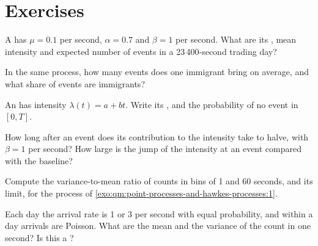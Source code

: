 \section{Exercises}

\begin{exercise}[$\star$]\label{exo:qm:point-processes-and-hawkes-processes:1}
A  has $\mu = 0.1$ per second, $\alpha = 0.7$ and $\beta = 1$ per second. What are its , mean
intensity and expected number of events in a 23\,400-second trading day?
\end{exercise}

\begin{exercise}[$\star$]\label{exo:qm:point-processes-and-hawkes-processes:2}
In the same process, how many events does one immigrant bring on average, and what share of events are
immigrants?
\end{exercise}

\begin{exercise}[$\star$]\label{exo:qm:point-processes-and-hawkes-processes:3}
An  has intensity $\lambda(t) = a + bt$. Write its , and the probability of
no event in $[0, T]$.
\end{exercise}

\begin{exercise}[$\star\star$]\label{exo:qm:point-processes-and-hawkes-processes:4}
How long after an event does its contribution to the intensity take to halve, with $\beta = 1$ per second? How large is
the jump of the intensity at an event compared with the baseline?
\end{exercise}

\begin{exercise}[$\star\star$]\label{exo:qm:point-processes-and-hawkes-processes:5}
Compute the variance-to-mean ratio of counts in bins of 1 and 60 seconds, and its limit, for the process of
\cref{exo:qm:point-processes-and-hawkes-processes:1}.
\end{exercise}

\begin{exercise}[$\star\star$]\label{exo:qm:point-processes-and-hawkes-processes:6}
Each day the arrival rate is 1 or 3 per second with equal probability, and within a day arrivals are Poisson.
What are the mean and the variance of the count in one second? Is this a ?
\end{exercise}

